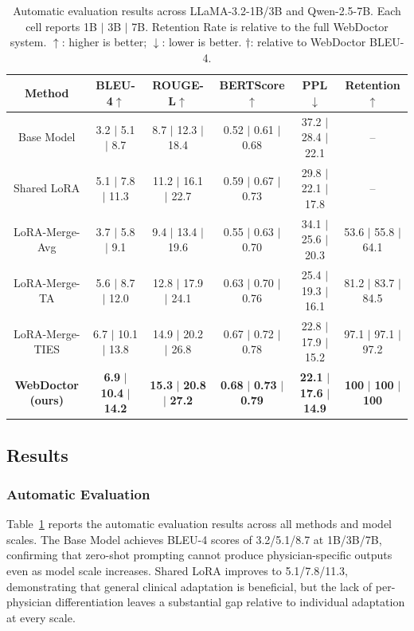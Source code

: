 \begin{table}[!t]
\footnotesize
\setlength{\tabcolsep}{2.5pt}
\renewcommand\arraystretch{1.06}
\centering
\caption{Automatic evaluation results across LLaMA-3.2-1B/3B and Qwen-2.5-7B. Each cell reports 1B $|$ 3B $|$ 7B. Retention Rate is relative to the full WebDoctor system. $\uparrow$: higher is better; $\downarrow$: lower is better. $\dagger$: relative to WebDoctor BLEU-4.}
\label{tab:accuracy}
\begin{tabular}{c|cccc|c}
\toprule
\textbf{Method} & \textbf{BLEU-4}$\uparrow$ & \textbf{ROUGE-L}$\uparrow$ & \textbf{BERTScore}$\uparrow$ & \textbf{PPL}$\downarrow$ & \textbf{Retention}$\uparrow$\\
\midrule
Base Model & 3.2 $|$ 5.1 $|$ 8.7 & 8.7 $|$ 12.3 $|$ 18.4 & 0.52 $|$ 0.61 $|$ 0.68 & 37.2 $|$ 28.4 $|$ 22.1 & --\\
\midrule
Shared LoRA & 5.1 $|$ 7.8 $|$ 11.3 & 11.2 $|$ 16.1 $|$ 22.7 & 0.59 $|$ 0.67 $|$ 0.73 & 29.8 $|$ 22.1 $|$ 17.8 & --\\
\midrule
LoRA-Merge-Avg & 3.7 $|$ 5.8 $|$ 9.1 & 9.4 $|$ 13.4 $|$ 19.6 & 0.55 $|$ 0.63 $|$ 0.70 & 34.1 $|$ 25.6 $|$ 20.3 & 53.6 $|$ 55.8 $|$ 64.1\\
LoRA-Merge-TA & 5.6 $|$ 8.7 $|$ 12.0 & 12.8 $|$ 17.9 $|$ 24.1 & 0.63 $|$ 0.70 $|$ 0.76 & 25.4 $|$ 19.3 $|$ 16.1 & 81.2 $|$ 83.7 $|$ 84.5\\
LoRA-Merge-TIES & 6.7 $|$ 10.1 $|$ 13.8 & 14.9 $|$ 20.2 $|$ 26.8 & 0.67 $|$ 0.72 $|$ 0.78 & 22.8 $|$ 17.9 $|$ 15.2 & 97.1 $|$ 97.1 $|$ 97.2\\
\midrule
\rowcolor{blue!5}
\textbf{WebDoctor (ours)} & \textbf{6.9} $|$ \textbf{10.4} $|$ \textbf{14.2} & \textbf{15.3} $|$ \textbf{20.8} $|$ \textbf{27.2} & \textbf{0.68} $|$ \textbf{0.73} $|$ \textbf{0.79} & \textbf{22.1} $|$ \textbf{17.6} $|$ \textbf{14.9} & \textbf{100} $|$ \textbf{100} $|$ \textbf{100}\\
\bottomrule
\end{tabular}
\end{table}


\subsection*{Results}

\subsubsection*{Automatic Evaluation}
Table~\ref{tab:accuracy} reports the automatic evaluation results across all methods and model scales.
The Base Model achieves BLEU-4 scores of 3.2/5.1/8.7 at 1B/3B/7B, confirming that zero-shot prompting cannot produce physician-specific outputs even as model scale increases.
Shared LoRA improves to 5.1/7.8/11.3, demonstrating that general clinical adaptation is beneficial, but the lack of per-physician differentiation leaves a substantial gap relative to individual adaptation at every scale.

